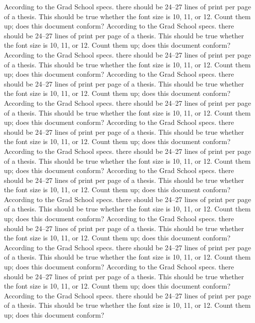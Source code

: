 According to the Grad School specs.   there should be 24--27 lines
of print per page of a thesis.  This should be true whether the font
size is 10, 11, or 12.  Count them up; does this document conform?
According to the Grad School specs.   there should be 24--27 lines
of print per page of a thesis.  This should be true whether the font
size is 10, 11, or 12.  Count them up; does this document conform?
According to the Grad School specs.   there should be 24--27 lines
of print per page of a thesis.  This should be true whether the font
size is 10, 11, or 12.  Count them up; does this document conform?
According to the Grad School specs.   there should be 24--27 lines
of print per page of a thesis.  This should be true whether the font
size is 10, 11, or 12.  Count them up; does this document conform?
According to the Grad School specs.   there should be 24--27 lines
of print per page of a thesis.  This should be true whether the font
size is 10, 11, or 12.  Count them up; does this document conform?
According to the Grad School specs.   there should be 24--27 lines
of print per page of a thesis.  This should be true whether the font
size is 10, 11, or 12.  Count them up; does this document conform?
According to the Grad School specs.   there should be 24--27 lines
of print per page of a thesis.  This should be true whether the font
size is 10, 11, or 12.  Count them up; does this document conform?
According to the Grad School specs.   there should be 24--27 lines
of print per page of a thesis.  This should be true whether the font
size is 10, 11, or 12.  Count them up; does this document conform?
According to the Grad School specs.   there should be 24--27 lines
of print per page of a thesis.  This should be true whether the font
size is 10, 11, or 12.  Count them up; does this document conform?
According to the Grad School specs.   there should be 24--27 lines
of print per page of a thesis.  This should be true whether the font
size is 10, 11, or 12.  Count them up; does this document conform?
According to the Grad School specs.   there should be 24--27 lines
of print per page of a thesis.  This should be true whether the font
size is 10, 11, or 12.  Count them up; does this document conform?
According to the Grad School specs.   there should be 24--27 lines
of print per page of a thesis.  This should be true whether the font
size is 10, 11, or 12.  Count them up; does this document conform?
According to the Grad School specs.   there should be 24--27 lines
of print per page of a thesis.  This should be true whether the font
size is 10, 11, or 12.  Count them up; does this document conform?
